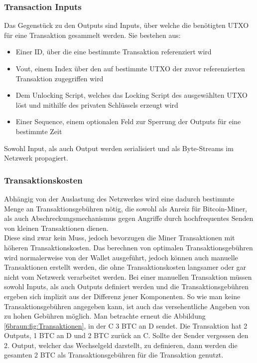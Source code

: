 \subsubsection{Transaction Inputs}
Das Gegenstück zu den Outputs sind Inputs, über welche die benötigten UTXO für eine Transaktion gesammelt werden. Sie bestehen aus:
\begin{itemize}
	\item Einer ID, über die eine bestimmte Transaktion referenziert wird
	\item Vout, einem Index über den auf bestimmte UTXO der zuvor referenzierten Transaktion zugegriffen wird
	\item Dem Unlocking Script, welches das Locking Script des ausgewählten UTXO löst und mithilfe des privaten Schlüssels erzeugt wird
	\item Einer Sequence, einem optionalen Feld zur Sperrung der Outputs für eine bestimmte Zeit
\end{itemize}
Sowohl Input, als auch Output werden serialisiert und als Byte-Streams im Netzwerk propagiert.\\
\subsubsection{Transaktionskosten}
Abhängig von der Auslastung des Netzwerkes wird eine dadurch bestimmte Menge an Transaktionsgebühren nötig, die sowohl als Anreiz für Bitcoin-Miner, als auch Abschreckungsmechanismus gegen Angriffe durch hochfrequentes Senden von kleinen Transaktionen dienen.\\
Diese sind zwar kein Muss, jedoch bevorzugen die Miner Transaktionen mit höheren Transaktionskosten. 
Das berechnen von optimalen Transaktionsgebühren wird normalerweise von der Wallet ausgeführt, jedoch können auch manuelle Transaktionen erstellt werden, die ohne Transaktionskosten langsamer oder gar nicht vom Netzwerk verarbeitet werden.
Bei einer manuellen Transaktion müssen sowohl Inputs, als auch Outputs definiert werden und die Transaktionsgebühren ergeben sich implizit aus der Differenz jener Komponenten. So wie man keine Transaktionsgebühren angegeben kann, ist auch das versehentliche Angeben von zu hohen Gebühren möglich. Man betrachte erneut die Abbildung \ref{6braun:fig:Transaktionen}, in der C 3 BTC an D sendet. Die Transaktion hat 2 Outputs, 1 BTC an D und 2 BTC zurück an C. Sollte der Sender vergessen den 2. Output, welcher das Wechselgeld darstellt, zu definieren, dann werden die gesamten 2 BTC als Transaktionsgebühren für die Transaktion genutzt.\\

